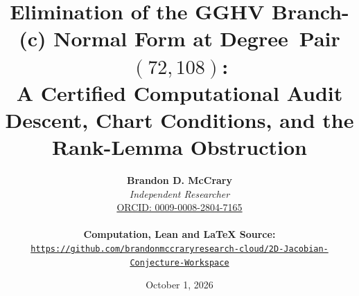 \documentclass[a4paper,11pt]{article}
\theoremstyle{plain}
\theoremstyle{definition}
\theoremstyle{remark}
\begin{document}
\title{\textbf{\Large Elimination of the GGHV Branch-(c) Normal Form at Degree~Pair $(72,108)$:}\\[0.6em]
\large A Certified Computational Audit\\[0.4em]
\normalsize Descent, Chart Conditions, and the Rank-Lemma Obstruction}
\author{\textbf{Brandon D. McCrary}\\[0.25em]
\textit{Independent Researcher}\\[0.25em]
\href{https://orcid.org/0009-0008-2804-7165}{ORCID: 0009-0008-2804-7165}\\[0.6em]
{\small \parbox{0.92\textwidth}{\centering \textbf{Computation, Lean and LaTeX Source:}\\
{\color{neonmagenta}\hypersetup{urlcolor=neonmagenta}\href{https://github.com/brandonmccraryresearch-cloud/2D-Jacobian-Conjecture-Workspace}{\nolinkurl{https://github.com/brandonmccraryresearch-cloud/2D-Jacobian-Conjecture-Workspace}}}}}}
\date{October 1, 2026}
\maketitle
\end{document}
